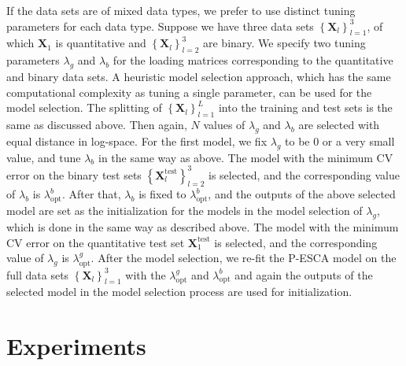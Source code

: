If the data sets are of mixed data types, we prefer to use distinct tuning parameters for each data type. Suppose we have three data sets $\left\{\mathbf{X}_l \right\}_{l=1}^3$, of which $\mathbf{X}_1$ is quantitative and  $\left\{\mathbf{X}_l \right\}_{l=2}^3$ are binary. We specify two tuning parameters $\lambda_{g}$ and $\lambda_{b}$ for the loading matrices corresponding to the quantitative and binary data sets. A heuristic model selection approach, which has the same computational complexity as tuning a single parameter, can be used for the model selection. The splitting of $\left\{ \mathbf{X}_l \right\}_{l=1}^{L}$ into the training and test sets is the same as discussed above. Then again, $N$ values of $\lambda_{g}$ and $\lambda_{b}$ are selected with equal distance in log-space. For the first model, we fix $\lambda_{g}$ to be 0 or a very small value, and tune $\lambda_{b}$ in the same way as above. The model with the minimum CV error on the binary test sets $\left\{\mathbf{X}_l^{\text{test}}\right\}_{l=2}^3$ is selected, and the corresponding value of $\lambda_b$ is $\lambda_{\text{opt}}^b$. After that, $\lambda_{b}$ is fixed to $\lambda_{\text{opt}}^b$, and the outputs of the above selected model are set as the initialization for the models in the model selection of $\lambda_{g}$, which is done in the same way as described above. The model with the minimum CV error on the quantitative test set $\mathbf{X}_1^{\text{test}}$ is selected, and the corresponding value of $\lambda_g$ is $\lambda_{\text{opt}}^g$. After the model selection, we re-fit the P-ESCA model on the full data sets $\left\{\mathbf{X}_l \right\}_{l=1}^3$ with the $\lambda_{\text{opt}}^g$ and $\lambda_{\text{opt}}^b$ and again the outputs of the selected model in the model selection process are used for initialization.

\section{Experiments} \label{section:5.6}
